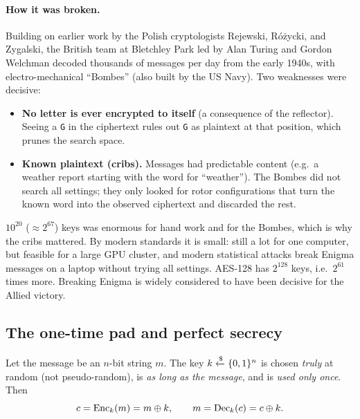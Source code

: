 \paragraph{How it was broken.} Building on earlier work by the Polish cryptologists Rejewski, Różycki, and Zygalski, the British team at Bletchley Park led by Alan Turing and Gordon Welchman decoded thousands of messages per day from the early 1940s, with electro-mechanical \enquote{Bombes} (also built by the US Navy). Two weaknesses were decisive:
\begin{itemize}
    \item \textbf{No letter is ever encrypted to itself} (a consequence of the reflector). Seeing a \texttt{G} in the ciphertext rules out \texttt{G} as plaintext at that position, which prunes the search space.
    \item \textbf{Known plaintext (cribs).} Messages had predictable content (e.g.\ a weather report starting with the word for \enquote{weather}). The Bombes did not search all settings; they only looked for rotor configurations that turn the known word into the observed ciphertext and discarded the rest.
\end{itemize}

\begin{remark}
$10^{20}$ ($\approx 2^{67}$) keys was enormous for hand work and for the Bombes, which is why the cribs mattered. By modern standards it is small: still a lot for one computer, but feasible for a large GPU cluster, and modern statistical attacks break Enigma messages on a laptop without trying all settings. AES-128 has $2^{128}$ keys, i.e.\ $2^{61}$ times more. Breaking Enigma is widely considered to have been decisive for the Allied victory.
\end{remark}

\subsection{The one-time pad and perfect secrecy}

\begin{definition}
Let the message be an $n$-bit string $m$. The key $k \xleftarrow{\$} \{0,1\}^n$ is chosen \emph{truly} at random (not pseudo-random), is \emph{as long as the message}, and is \emph{used only once}. Then
\[
    c = \operatorname{Enc}_k(m) = m \oplus k, \qquad m = \operatorname{Dec}_k(c) = c \oplus k.
\]
\end{definition}

